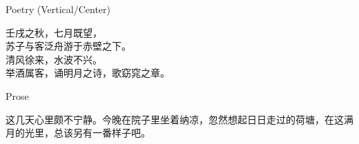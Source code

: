 \documentclass[theme=lit, aspectratio=169]{Hypo-Slide}
\begin{document}
\frame{\titlepage}

\begin{frame}{Poetry (Vertical/Center)}
  \begin{poem}[title=赤壁赋（节选）]
    壬戌之秋，七月既望，\\
    苏子与客泛舟游于赤壁之下。\\
    清风徐来，水波不兴。\\
    举酒属客，诵明月之诗，歌窈窕之章。
  \end{poem}
\end{frame}

\begin{frame}{Prose}
  \begin{quotepara}[title=荷塘月色]
    这几天心里颇不宁静。今晚在院子里坐着纳凉，忽然想起日日走过的荷塘，在这满月的光里，总该另有一番样子吧。
  \end{quotepara}
\end{frame}
\end{document}
